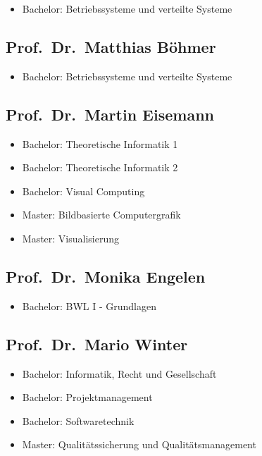 \begin{itemize}
\tightlist
\item
  Bachelor: Betriebssysteme und verteilte Systeme
\end{itemize}

\subsection{Prof.~Dr.~Matthias
Böhmer}\label{prof.dr.matthias-buxf6hmer}

\begin{itemize}
\tightlist
\item
  Bachelor: Betriebssysteme und verteilte Systeme
\end{itemize}

\subsection{Prof.~Dr.~Martin Eisemann}\label{prof.dr.martin-eisemann}

\begin{itemize}
\tightlist
\item
  Bachelor: Theoretische Informatik 1
\item
  Bachelor: Theoretische Informatik 2
\item
  Bachelor: Visual Computing
\item
  Master: Bildbasierte Computergrafik
\item
  Master: Visualisierung
\end{itemize}

\subsection{Prof.~Dr.~Monika Engelen}\label{prof.dr.monika-engelen}

\begin{itemize}
\tightlist
\item
  Bachelor: BWL I - Grundlagen
\end{itemize}

\subsection{Prof.~Dr.~Mario Winter}\label{prof.dr.mario-winter}

\begin{itemize}
\tightlist
\item
  Bachelor: Informatik, Recht und Gesellschaft
\item
  Bachelor: Projektmanagement
\item
  Bachelor: Softwaretechnik
\item
  Master: Qualitätssicherung und Qualitätsmanagement
\end{itemize}

